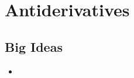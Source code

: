 \chapter{Antiderivatives}
\label{chap:A}

\section{Big Ideas}
\label{sec:A Big Ideas}
\begin{itemize}
  \item 
\end{itemize}